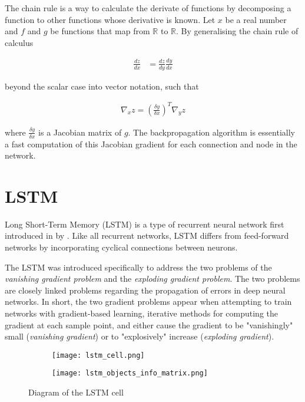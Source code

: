 \newcommand{\R}{\mathbb{R}}

The chain rule is a way to calculate the derivate of functions by decomposing a function to other functions whose derivative is known. Let $x$ be a real number and $f$ and $g$ be functions that map from $\R$ to $\R$. By generalising the chain rule of calculus

\begin{align}
    \frac{dz}{dx} &= \frac{dz}{dy}\frac{dy}{dx}
\end{align}

beyond the scalar case into vector notation, such that 

\begin{align}
    \nabla_{x}z = (\frac{\delta y}{\delta x})^T \nabla_{y}z
\end{align}

where $\frac{\delta y}{\delta x}$ is a Jacobian matrix of $g$. The backpropagation algorithm is essentially a fast computation of this Jacobian gradient for each connection and node in the network.

\section{LSTM}
Long Short-Term Memory (LSTM) is a type of recurrent neural network first introduced in \citeyear{lstm} by \citeauthor{lstm}. Like all recurrent networks, LSTM differs from feed-forward networks by incorporating cyclical connections between neurons.

The LSTM was introduced specifically to address the two problems of the \emph{vanishing gradient problem} and the \emph{exploding gradient problem}. The two problems are closely linked problems regarding the propagation of errors in deep neural networks. In short, the two gradient problems appear when attempting to train networks with gradient-based learning, iterative methods for computing the gradient at each sample point, and either cause the gradient to be "vanishingly" small (\emph{vanishing gradient}) or to "explosively" increase (\emph{exploding gradient}).

\begin{figure}[H]
    \centering
    \begin{subfigure}{.5\textwidth}
        \centering
        \texttt{[image: lstm\_cell.png]}
        \label{tab:lstm_cell}
    \end{subfigure}%
    \centering
    \begin{subfigure}{.5\textwidth}
        \centering
        \texttt{[image: lstm\_objects\_info\_matrix.png]}
        \label{tab:lstm_cell_info}
    \end{subfigure}
    \caption{Diagram of the LSTM cell}
\end{figure}


